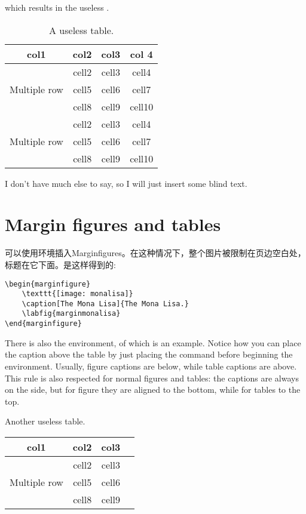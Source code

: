 which results in the useless .

\begin{table}[h]
\caption[A useless table]{A useless table.}
\begin{tabular}{ c c c c }
	\toprule
	col1 & col2 & col3 & col 4 \\
	\midrule
	\multirow{3}{4em}{Multiple row} & cell2 & cell3 & cell4\\ &
	cell5 & cell6 & cell7 \\ &
	cell8 & cell9 & cell10 \\
	\multirow{3}{4em}{Multiple row} & cell2 & cell3 & cell4 \\ &
	cell5 & cell6 & cell7 \\ &
	cell8 & cell9 & cell10 \\
	\bottomrule
\end{tabular}
\end{table}

I don't have much else to say, so I will just insert some blind text. 
\blindtext

\section{Margin figures and tables}

可以使用环境插入Marginfigures。在这种情况下，整个图片被限制在页边空白处，标题在它下面。是这样得到的:

\begin{lstlisting}
\begin{marginfigure}
	\texttt{[image: monalisa]}
	\caption[The Mona Lisa]{The Mona Lisa.}
	\labfig{marginmonalisa}
\end{marginfigure}
\end{lstlisting}

There is also the  environment, of which 
 is an example. Notice how you can place the 
caption above the table by just placing the  command 
before beginning the  environment. Usually, figure 
captions are below, while table captions are above. This rule is also 
respected for normal figures and tables: the captions are always on the 
side, but for figure they are aligned to the bottom, while for tables to 
the top.

\begin{margintable}
\caption[Another useless table]{Another useless table.}
\raggedright
\begin{tabular}{ c c c c }
	\hline
	col1 & col2 & col3 \\
	\hline
	\multirow{3}{4em}{Multiple row} & cell2 & cell3 \\ & cell5 & cell6 
	\\ & cell8 & cell9 \\ \hline
\end{tabular}
\end{margintable}

